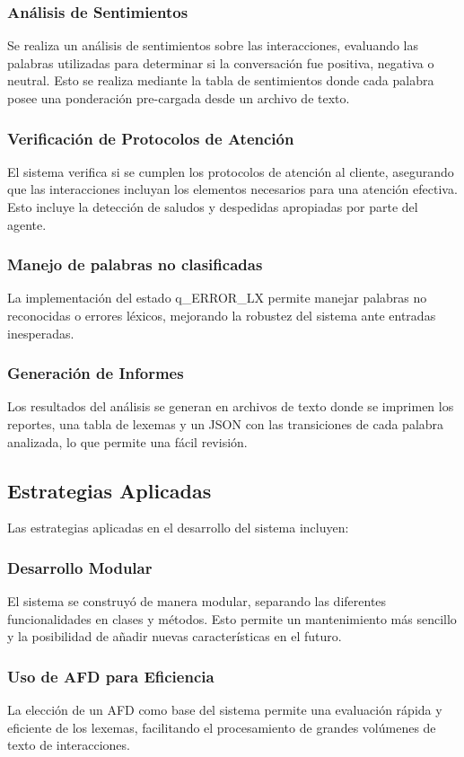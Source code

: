 \documentclass[12pt,a4paper]{article}
\begin{document}
\subsubsection{Análisis de Sentimientos}
Se realiza un análisis de sentimientos sobre las interacciones, evaluando las palabras utilizadas para determinar si la conversación fue positiva, negativa o neutral. Esto se realiza mediante la tabla de sentimientos donde cada palabra posee una ponderación pre-cargada desde un archivo de texto.
\subsubsection{Verificación de Protocolos de Atención}
El sistema verifica si se cumplen los protocolos de atención al cliente, asegurando que las interacciones incluyan los elementos necesarios para una atención efectiva. Esto incluye la detección de saludos y despedidas apropiadas por parte del agente.
\subsubsection{Manejo de palabras no clasificadas}
La implementación del estado q\_ERROR\_LX permite manejar palabras no reconocidas o errores léxicos, mejorando la robustez del sistema ante entradas inesperadas.
\subsubsection{Generación de Informes}
Los resultados del análisis se generan en archivos de texto donde se imprimen los reportes, una tabla de lexemas y un JSON con las transiciones de cada palabra analizada, lo que permite una fácil revisión.

\subsection{Estrategias Aplicadas}
Las estrategias aplicadas en el desarrollo del sistema incluyen:

\subsubsection{Desarrollo Modular}
El sistema se construyó de manera modular, separando las diferentes funcionalidades en clases y métodos. Esto permite un mantenimiento más sencillo y la posibilidad de añadir nuevas características en el futuro.
\subsubsection{Uso de AFD para Eficiencia}
La elección de un AFD como base del sistema permite una evaluación rápida y eficiente de los lexemas, facilitando el procesamiento de grandes volúmenes de texto de interacciones.
\end{document}
